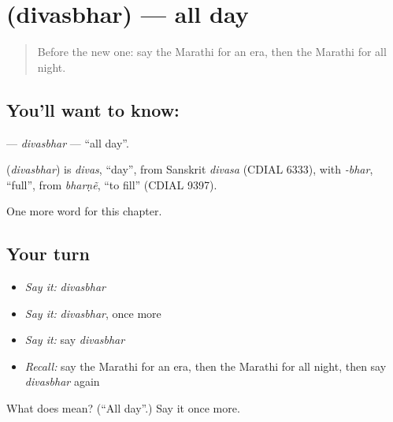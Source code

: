\section[\texorpdfstring{\mr{दिवसभर} (divasbhar)}{दिवसभर (divasbhar)}]{ (divasbhar) — all day}

\label{lesson:MR-C258-divasbhar}



\begin{quote}
Before the new one: say the Marathi for an era, then the Marathi for all night.
\end{quote}

\subsection*{You'll want to know: }
\textbf{} — \emph{divasbhar} — \textquotedblleft{}all day\textquotedblright{}.

\begin{cousinweb}
\textbf{} (\emph{divasbhar}) is \emph{divas}, \textquotedblleft{}day\textquotedblright{}, from Sanskrit \emph{divasa} (CDIAL 6333), with \emph{-bhar}, \textquotedblleft{}full\textquotedblright{}, from \emph{bharṇẽ}, \textquotedblleft{}to fill\textquotedblright{} (CDIAL 9397).
\end{cousinweb}

\begin{grammarlens}[title={What you've built}]
One more word for this chapter.
\end{grammarlens}

\subsection*{Your turn}
\begin{itemize}
\raggedright
  \item \emph{Say it:} \emph{divasbhar}
  \item \emph{Say it:} \emph{divasbhar}, once more
  \item \emph{Say it:} say \emph{divasbhar}
  \item \emph{Recall:} say the Marathi for an era, then the Marathi for all night, then say \emph{divasbhar} again
\end{itemize}

\begin{tcolorbox}[breakable,colback=teal!4,colframe=teal!35!black,title={Before you move on}]
What does  mean? (\textquotedblleft{}All day\textquotedblright{}.) Say it once more.
\end{tcolorbox}
